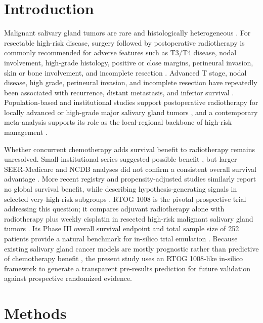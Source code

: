 \documentclass[10pt,twocolumn]{article}
\begin{document}
\section{Introduction}

Malignant salivary gland tumors are rare and histologically heterogeneous \cite{ref1,ref2}. For resectable high-risk disease, surgery followed by postoperative radiotherapy is commonly recommended for adverse features such as T3/T4 disease, nodal involvement, high-grade histology, positive or close margins, perineural invasion, skin or bone involvement, and incomplete resection \cite{ref1,ref2}. Advanced T stage, nodal disease, high grade, perineural invasion, and incomplete resection have repeatedly been associated with recurrence, distant metastasis, and inferior survival \cite{ref5}. Population-based and institutional studies support postoperative radiotherapy for locally advanced or high-grade major salivary gland tumors \cite{ref7,ref8}, and a contemporary meta-analysis supports its role as the local-regional backbone of high-risk management \cite{ref10}.


Whether concurrent chemotherapy adds survival benefit to radiotherapy remains unresolved. Small institutional series suggested possible benefit \cite{ref11,ref12}, but larger SEER-Medicare and NCDB analyses did not confirm a consistent overall survival advantage \cite{ref14,ref15}. More recent registry and propensity-adjusted studies similarly report no global survival benefit, while describing hypothesis-generating signals in selected very-high-risk subgroups \cite{ref17,ref18,ref19,ref20,ref21}. RTOG 1008 is the pivotal prospective trial addressing this question; it compares adjuvant radiotherapy alone with radiotherapy plus weekly cisplatin in resected high-risk malignant salivary gland tumors \cite{ref22,ref23,ref24}. Its Phase III overall survival endpoint and total sample size of 252 patients provide a natural benchmark for in-silico trial emulation \cite{ref23,ref24}. Because existing salivary gland cancer models are mostly prognostic rather than predictive of chemotherapy benefit \cite{ref25,ref26,ref27,ref28,ref29,ref30,ref31}, the present study uses an RTOG 1008-like in-silico framework to generate a transparent pre-results prediction for future validation against prospective randomized evidence.


\section{Methods}
\end{document}
